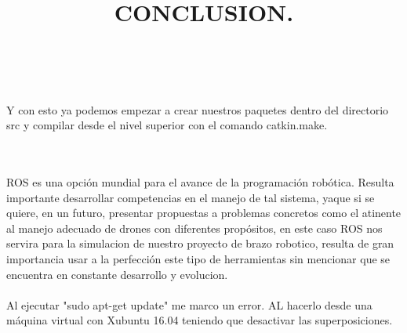 \documentclass[12pt,a4paper]{article}
\begin{document}
\\\\
Y con esto ya podemos empezar a crear nuestros paquetes dentro del directorio src y compilar desde el nivel superior con el comando catkin.make.
\newpage
\title{CONCLUSION.} 
\\\\
ROS es una opción mundial para el avance de la programación robótica. Resulta importante desarrollar competencias en el manejo de tal sistema, yaque si se quiere, en un futuro, presentar propuestas a problemas concretos como el atinente al manejo adecuado de drones con diferentes propósitos, en este caso ROS nos servira para  la simulacion de nuestro proyecto de brazo robotico, resulta de gran importancia usar a la perfección este tipo de herramientas sin mencionar que se encuentra en constante  desarrollo y evolucion.
\\\\
 Al ejecutar "sudo apt-get update" me marco un error. AL hacerlo desde una máquina virtual con Xubuntu 16.04 teniendo que desactivar las superposiciones.
\end{document}
